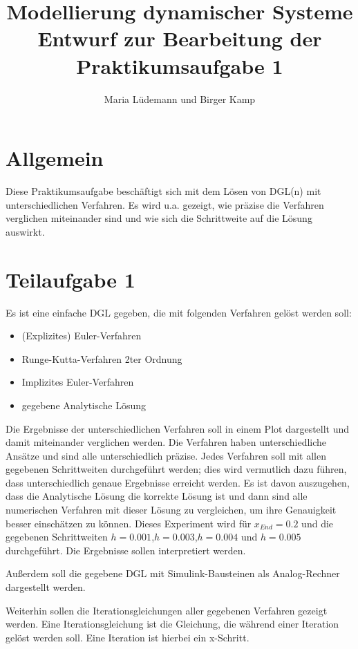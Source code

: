 \documentclass[]{scrartcl}
\title{Modellierung dynamischer Systeme  \\ Entwurf zur Bearbeitung der Praktikumsaufgabe 1}
\author{Maria Lüdemann und Birger Kamp}
\begin{document}
\maketitle

\begin{abstract}

\end{abstract}

\section{Allgemein}
Diese Praktikumsaufgabe beschäftigt sich mit dem Lösen von DGL(n) mit unterschiedlichen Verfahren. Es wird u.a. gezeigt, wie präzise die Verfahren verglichen miteinander sind und wie sich die Schrittweite auf die Lösung auswirkt.

\section{Teilaufgabe 1}
Es ist eine einfache DGL gegeben, die mit folgenden Verfahren gelöst werden soll:

\begin{itemize}
	\item (Explizites) Euler-Verfahren
	\item Runge-Kutta-Verfahren 2ter Ordnung
	\item Implizites Euler-Verfahren
	\item gegebene Analytische Lösung
\end{itemize}

Die Ergebnisse der unterschiedlichen Verfahren soll in einem Plot dargestellt und damit miteinander verglichen werden. Die Verfahren haben unterschiedliche Ansätze und sind alle unterschiedlich präzise. Jedes Verfahren soll mit allen gegebenen Schrittweiten durchgeführt werden; dies wird vermutlich dazu führen, dass unterschiedlich genaue Ergebnisse erreicht werden. Es ist davon auszugehen, dass die Analytische Lösung die korrekte Lösung ist und dann sind alle numerischen Verfahren mit dieser Lösung zu vergleichen, um ihre Genauigkeit besser einschätzen zu können. Dieses Experiment wird für $x_{End} = 0.2$ und die gegebenen Schrittweiten $h=0.001$,$h=0.003$,$h=0.004$  und $h=0.005$ durchgeführt. Die Ergebnisse sollen interpretiert werden.

Außerdem soll die gegebene DGL mit Simulink-Bausteinen als Analog-Rechner dargestellt werden.

Weiterhin sollen die Iterationsgleichungen aller gegebenen Verfahren gezeigt werden. Eine Iterationsgleichung ist die Gleichung, die während einer Iteration gelöst werden soll. Eine Iteration ist hierbei ein x-Schritt.
\end{document}
